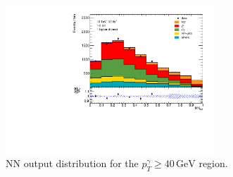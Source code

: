 \begin{figure}
    \centering
    \includegraphics[width=0.7\textwidth]{Plots/NN_out_mixphA40.pdf}
    \caption{NN output distribution for the $p_T^\gamma \geq 40\,\si{\giga\electronvolt}$ region.}
    \label{fig:outputA40ph}
\end{figure} 

